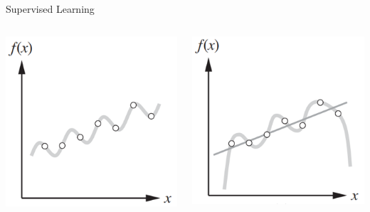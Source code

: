 \documentclass[8pt,aspectratio=169]{beamer}
\begin{document}
\begin{frame}{Supervised Learning}
\begin{columns}[T]
\pause
\begin{column}{.2\textwidth}
\begin{center}
  \includegraphics[scale=0.65]{figures/supervised-learn-f-2}
\end{center}
\end{column}

\pause
\begin{column}{.2\textwidth}
\begin{center}
  \includegraphics[scale=0.65]{figures/supervised-learn-f-3}
\end{center}
\end{column}
\end{columns}

\end{frame}

\end{document}
